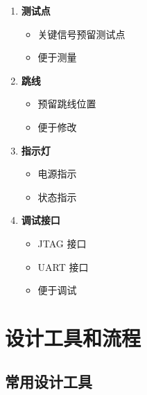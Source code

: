 \begin{enumerate}
  \item \textbf{测试点}
    \begin{itemize}
      \item 关键信号预留测试点
      \item 便于测量
    \end{itemize}

  \item \textbf{跳线}
    \begin{itemize}
      \item 预留跳线位置
      \item 便于修改
    \end{itemize}

  \item \textbf{指示灯}
    \begin{itemize}
      \item 电源指示
      \item 状态指示
    \end{itemize}

  \item \textbf{调试接口}
    \begin{itemize}
      \item JTAG 接口
      \item UART 接口
      \item 便于调试
    \end{itemize}
\end{enumerate}

\section{设计工具和流程}

\subsection{常用设计工具}

